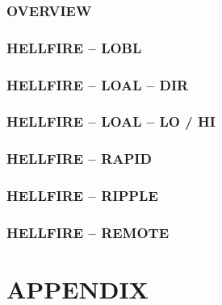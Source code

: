 \documentclass[fontHelvetica]{TechCheck}
\begin{document}
	\subsection{OVERVIEW}
	\subsection{HELLFIRE -- LOBL}
	\subsection{HELLFIRE -- LOAL -- DIR}
	\subsection{HELLFIRE -- LOAL -- LO / HI}
	\subsection{HELLFIRE -- RAPID}
	\subsection{HELLFIRE -- RIPPLE}
	\subsection{HELLFIRE -- REMOTE}

	\cleardoublepage

	\chapter{APPENDIX}
	\minitoc
	\cleardoublepage



  \cleardoublepage

\iftoggle{print}{
	\pagestyle{empty}
	\newpage \null
	\thumbwide
	\newpage \null
}{}
\end{document}
